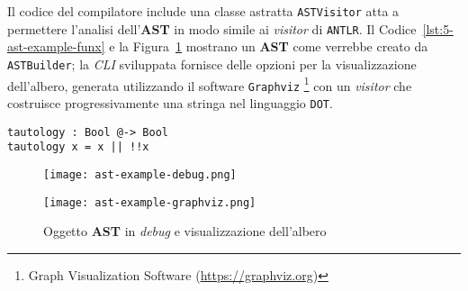 \newpage

\noindent Il codice del compilatore include una classe astratta \texttt{ASTVisitor} atta a permettere l'analisi
dell'\textbf{AST} in modo simile ai \textit{visitor} di \texttt{ANTLR}.
Il Codice~\ref{lst:5-ast-example-funx} e la Figura~\ref{fig:5-ast-example-debug-graphviz}
mostrano un \textbf{AST} come verrebbe creato da \texttt{ASTBuilder}; la \textit{CLI} sviluppata fornisce
delle opzioni per la visualizzazione dell'albero, generata utilizzando il software \texttt{Graphviz}%
\footnote{Graph Visualization Software (\url{https://graphviz.org})}
con un \textit{visitor} che costruisce progressivamente una stringa nel linguaggio \texttt{DOT}.

\vspace{4mm}
\begin{lstlisting}[caption={Programma in \textbf{Funx}}, style=funxCode, label={lst:5-ast-example-funx}]
tautology : Bool @-> Bool
tautology x = x || !!x
\end{lstlisting}

\begin{figure}
    \vspace{4mm}
    \begin{minipage}[c]{0.6\textwidth}
        \centering
        \texttt{[image: ast-example-debug.png]}
    \end{minipage}%
    \hfill
    \begin{minipage}[c]{0.4\textwidth}
        \centering
        \texttt{[image: ast-example-graphviz.png]}
    \end{minipage}
    \caption{Oggetto \textbf{AST} in \textit{debug} e visualizzazione dell'albero}
    \label{fig:5-ast-example-debug-graphviz}
\end{figure}